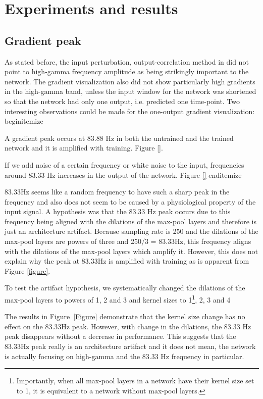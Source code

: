 \chapter{Experiments and results}
\label{ch:exp}

\section{Gradient peak}\label{sec:gradient-peak}
As stated before, the input perturbation, output-correlation method in \cite{Hammer_2021} did not point to high-gamma frequency amplitude as being strikingly important to the network. The gradient visualization also did not show particularly high gradients in the high-gamma band, unless the input window for the network was shortened so that the network had only one output, i.e. predicted one time-point. Two interesting observations could be made for the one-output gradient visualization:
begin{itemize}
\item[1.] A gradient peak occurs at 83.88 Hz in both the untrained and the trained network and it is amplified with training. Figure \ref{}.
\item[2.] If we add noise of a certain frequency or white noise to the input, frequencies around 83.33 Hz increases in the output of the network. Figure \ref{}
end{itemize}

83.33Hz seems like a random frequency to have such a sharp peak in the frequency and also does not seem to be caused by a physiological property of the input signal.
A hypothesis was that the 83.33 Hz peak occurs due to this frequency being aligned with the dilations of the max-pool layers and therefore is just an architecture artifact.
Because sampling rate is 250 and the dilations of the max-pool layers are powers of three and 250/3 = 83.33Hz, this frequency aligns with the dilations of the max-pool layers which amplify it.
However, this does not explain why the peak at 83.33Hz is amplified with training as is apparent from Figure \ref{figure}.

To test the artifact hypothesis, we systematically changed the dilations of the max-pool layers to powers of 1, 2 and 3 and kernel sizes to 1\footnote{Importantly, when all max-pool layers in a network have their kernel size set to 1, it is equivalent to a network without max-pool layers.}, 2, 3 and 4

The results in Figure~\ref{Figure} demonstrate that the kernel size change has no effect on the 83.33Hz peak.
However, with change in the dilations, the 83.33 Hz peak disappears without a decrease in performance.
This suggests that the 83.33Hz peak really is an architecture artifact and it does not mean, the network is actually focusing on high-gamma and the 83.33 Hz frequency in particular.

